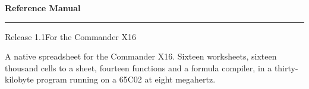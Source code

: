 \thispagestyle{empty}
\ccthumbfalse

\begin{center}

\vspace*{0.55in}

\cclogo[4.55in]

\vspace{0.62in}

{\sffamily\bfseries\fontsize{30}{34}\selectfont Reference Manual}

\vspace{12pt}

\rule{4.55in}{2.5pt}

\vspace{16pt}

{\sffamily\fontsize{11.5}{14}\selectfont
 Release 1.1\quad\textbullet\quad For the Commander X16}

\vfill

\begin{minipage}{4.2in}
\centering\fontsize{9.5}{13}\selectfont
A native spreadsheet for the Commander X16. Sixteen worksheets, sixteen
thousand cells to a sheet, fourteen functions and a formula compiler, in a
thirty-kilobyte program running on a 65C02 at eight megahertz.
\end{minipage}

\vspace{0.5in}

{\ccmark[0.52in]}

\vspace{0.45in}

\end{center}

\clearpage
